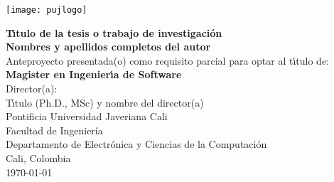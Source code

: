 \begin{center}
\thispagestyle{empty}
\vspace*{-1cm}
\begin{center}
    \texttt{[image: pujlogo]}~\\[1.75cm]
\end{center}
\textbf{\huge
T\'{\i}tulo de la tesis  o trabajo de investigación}\\[1.75cm]
\Large\textbf{Nombres y apellidos completos del autor}\\[1.5cm]
\small Anteproyecto presentada(o) como requisito parcial para optar al
t\'{\i}tulo de:\\
\textbf{Magister en Ingenier\'{\i}a de Software}\\[1.5cm]
Director(a):\\
T\'{\i}tulo (Ph.D., MSc) y nombre del director(a)\\[1.6cm]

Pontificia Universidad Javeriana Cali\\
Facultad de Ingeniería\\
Departamento de Electrónica y Ciencias de la Computación\\
Cali, Colombia\\
\today\\
\end{center}
